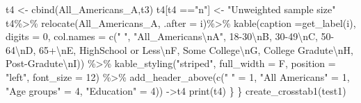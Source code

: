 \documentclass[
]{article}
\newenvironment{Shaded}{\begin{snugshade}}{\end{snugshade}}
\newcommand{\AttributeTok}[1]{\textcolor[rgb]{0.77,0.63,0.00}{#1}}
\newcommand{\DecValTok}[1]{\textcolor[rgb]{0.00,0.00,0.81}{#1}}
\newcommand{\FunctionTok}[1]{\textcolor[rgb]{0.00,0.00,0.00}{#1}}
\newcommand{\NormalTok}[1]{#1}
\newcommand{\OtherTok}[1]{\textcolor[rgb]{0.56,0.35,0.01}{#1}}
\newcommand{\SpecialCharTok}[1]{\textcolor[rgb]{0.00,0.00,0.00}{#1}}
\newcommand{\StringTok}[1]{\textcolor[rgb]{0.31,0.60,0.02}{#1}}
\begin{document}
\begin{Shaded}
\begin{Highlighting}[]
\NormalTok{t4 }\OtherTok{\textless{}{-}} \FunctionTok{cbind}\NormalTok{(All\_Americans\_A,t3)}
\NormalTok{t4[t4 }\SpecialCharTok{==}\StringTok{"n"}\NormalTok{] }\OtherTok{\textless{}{-}} \StringTok{"Unweighted sample size"}
\NormalTok{t4}\SpecialCharTok{\%\textgreater{}\%}
  \FunctionTok{relocate}\NormalTok{(All\_Americans\_A, }\AttributeTok{.after =}\NormalTok{ i)}\SpecialCharTok{\%\textgreater{}\%}
  \FunctionTok{kable}\NormalTok{(}\AttributeTok{caption =}\FunctionTok{get\_label}\NormalTok{(i), }\AttributeTok{digits =} \DecValTok{0}\NormalTok{, }
        \AttributeTok{col.names =} \FunctionTok{c}\NormalTok{(}\StringTok{" "}\NormalTok{, }\StringTok{"All\_Americans}\SpecialCharTok{\textbackslash{}n}\StringTok{A"}\NormalTok{, }\StringTok{\textquotesingle{}18{-}30}\SpecialCharTok{\textbackslash{}n}\StringTok{B\textquotesingle{}}\NormalTok{, }\StringTok{\textquotesingle{}30{-}49}\SpecialCharTok{\textbackslash{}n}\StringTok{C\textquotesingle{}}\NormalTok{, }\StringTok{\textquotesingle{}50{-}64}\SpecialCharTok{\textbackslash{}n}\StringTok{D\textquotesingle{}}\NormalTok{, }\StringTok{\textquotesingle{}65+}\SpecialCharTok{\textbackslash{}n}\StringTok{E\textquotesingle{}}\NormalTok{,}
                      \StringTok{\textquotesingle{}HighSchool or Less}\SpecialCharTok{\textbackslash{}n}\StringTok{F\textquotesingle{}}\NormalTok{, }\StringTok{\textquotesingle{}Some College}\SpecialCharTok{\textbackslash{}n}\StringTok{G\textquotesingle{}}\NormalTok{, }\StringTok{\textquotesingle{}College  Gradute}\SpecialCharTok{\textbackslash{}n}\StringTok{H\textquotesingle{}}\NormalTok{,}
                      \StringTok{\textquotesingle{}Post{-}Gradute}\SpecialCharTok{\textbackslash{}n}\StringTok{I\textquotesingle{}}\NormalTok{)) }\SpecialCharTok{\%\textgreater{}\%}
  \FunctionTok{kable\_styling}\NormalTok{(}\StringTok{"striped"}\NormalTok{, }\AttributeTok{full\_width =}\NormalTok{ F,}
                \AttributeTok{position =} \StringTok{"left"}\NormalTok{, }\AttributeTok{font\_size =} \DecValTok{12}\NormalTok{) }\SpecialCharTok{\%\textgreater{}\%}
  \FunctionTok{add\_header\_above}\NormalTok{(}\FunctionTok{c}\NormalTok{(}\StringTok{" "} \OtherTok{=} \DecValTok{1}\NormalTok{, }\StringTok{"All Americans"} \OtherTok{=} \DecValTok{1}\NormalTok{, }\StringTok{"Age groups"} \OtherTok{=} \DecValTok{4}\NormalTok{, }\StringTok{"Education"} \OtherTok{=} \DecValTok{4}\NormalTok{)) }\OtherTok{{-}\textgreater{}}\NormalTok{t4}
\FunctionTok{print}\NormalTok{(t4)}
\NormalTok{\}}
\NormalTok{\}}
\FunctionTok{create\_crosstab1}\NormalTok{(test1)}
\end{Highlighting}
\end{Shaded}
\end{document}
